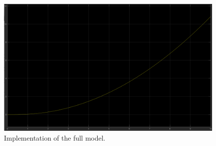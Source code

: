 \begin{figure}[H]
  \centering
    \includegraphics[width=1\textwidth]{images/Ny.png}
	\caption{Implementation of the full model.}
	\label{openloop5}
\end{figure}

